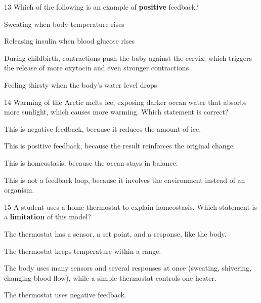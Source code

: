 \documentclass[11pt,letterpaper]{article}
\begin{document}

\begin{mcq}{13}
Which of the following is an example of \textbf{positive} feedback?
\begin{choices}
  \item Sweating when body temperature rises
  \item Releasing insulin when blood glucose rises
  \item During childbirth, contractions push the baby against the cervix, which triggers the release of more oxytocin and even stronger contractions
  \item Feeling thirsty when the body's water level drops
\end{choices}
\end{mcq}

\begin{mcq}{14}
Warming of the Arctic melts ice, exposing darker ocean water that absorbs more sunlight, which causes more warming. Which statement is correct?
\begin{choices}
  \item This is negative feedback, because it reduces the amount of ice.
  \item This is positive feedback, because the result reinforces the original change.
  \item This is homeostasis, because the ocean stays in balance.
  \item This is not a feedback loop, because it involves the environment instead of an organism.
\end{choices}
\end{mcq}

\begin{mcq}{15}
A student uses a home thermostat to explain homeostasis. Which statement is a \textbf{limitation} of this model?
\begin{choices}
  \item The thermostat has a sensor, a set point, and a response, like the body.
  \item The thermostat keeps temperature within a range.
  \item The body uses many sensors and several responses at once (sweating, shivering, changing blood flow), while a simple thermostat controls one heater.
  \item The thermostat uses negative feedback.
\end{choices}
\end{mcq}
\end{document}

